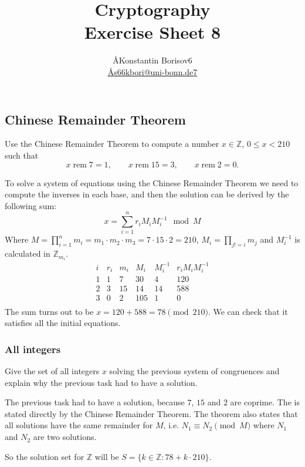 \documentclass{article}
\title{Cryptography \\ Exercise Sheet 8}
\author{
  \AA{Konstantin Borisov}{6} \\
  \href{mailto:\AA{s66kbori@uni-bonn.de}{7}}{\AA{s66kbori@uni-bonn.de}{7}}
}
\newcommand{\Z}{\mathbb{Z}}
\begin{document}
  \maketitle

  \setcounter{section}{8}
  \subsection{Chinese Remainder Theorem}
  \begin{centerframebox}
    Use the Chinese Remainder Theorem to compute a number $x \in \Z$, $0 \leq x < 210$ such that
    \[ x \operatorname{rem} 7 = 1, \qquad x \operatorname{rem} 15 = 3, \qquad x \operatorname{rem} 2 = 0. \]
  \end{centerframebox}
  To solve a system of equations using the Chinese Remainder Theorem we need to compute the inverses in each base,
  and then the solution can be derived by the following sum:
  \[ x = \sum_{i=1}^n r_i M_i M_i^{-1} \mod M \]
  Where $M = \prod_{i=1}^n m_i = m_1 \cdot m_2 \cdot m_3 = 7 \cdot 15 \cdot 2 = 210$, $M_i = \prod_{j != i} m_j$
  and $M_i^{-1}$ is calculated in $\Z_{m_i}$.
  \[
    \begin{array}{c|c|c|c|c|c}
      i & r_i & m_i & M_i & M_i^{-1} & r_i M_i M_i^{-1} \\
      \hline
      1 & 1 & 7 & 30 & 4 & 120 \\
      2 & 3 & 15 & 14 & 14 & 588 \\
      3 & 0 & 2 & 105 & 1 & 0 \\
    \end{array}
  \]
  The sum turns out to be $x = 120+588 = 78 \pmod{210}$. We can check that it satisfies all the initial equations.

  \subsubsection{All integers}
  \begin{centerframebox}
    Give the set of all integers $x$ solving the previous system of congruences and explain why the previous task had to have a solution.
  \end{centerframebox}
  The previous task had to have a solution, because $7$, $15$ and $2$ are coprime.
  The is stated directly by the Chinese Remainder Theorem.
  The theorem also states that all solutions have the same remainder for $M$,
  i.e. $N_1 \equiv N_2 \pmod{M}$ where $N_1$ and $N_2$ are two solutions.

  So the solution set for $\Z$ will be $S = \{k \in \Z : 78 + k \cdot 210\}$.
\end{document}
